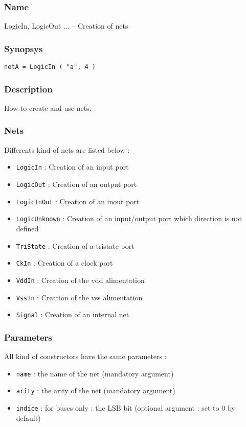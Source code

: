 \subsubsection{Name}

LogicIn, LogicOut ... -- Creation of nets

\subsubsection{Synopsys}

\begin{verbatim}
netA = LogicIn ( "a", 4 )
\end{verbatim}

\subsubsection{Description}

How to create and use nets.

\subsubsection{Nets}

Differents kind of nets are listed below :
\begin{itemize}
    \item \verb-LogicIn- : Creation of an input port
    \item \verb-LogicOut- : Creation of an output port
    \item \verb-LogicInOut- : Creation of an inout port
    \item \verb-LogicUnknown- : Creation of an input/output port which direction is not defined
    \item \verb-TriState- : Creation of a tristate port
    \item \verb-CkIn- : Creation of a clock port
    \item \verb-VddIn- : Creation of the vdd alimentation
    \item \verb-VssIn- : Creation of the vss alimentation
    \item \verb-Signal- : Creation of an internal net
\end{itemize}
        
\subsubsection{Parameters}

All kind of constructors have the same parameters :
\begin{itemize}
    \item \verb-name- : the name of the net (mandatory argument)
    \item \verb-arity- : the arity of the net (mandatory argument)
    \item \verb-indice- : for buses only : the LSB bit (optional argument : set to 0 by default)
\end{itemize}

